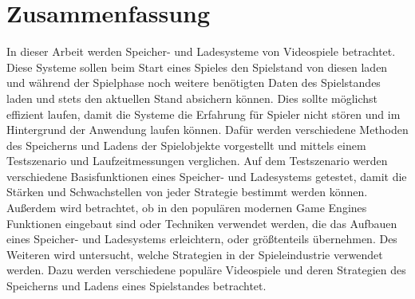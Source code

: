 \chapter*{Zusammenfassung}


In dieser Arbeit werden Speicher- und Ladesysteme von Videospiele betrachtet. Diese Systeme sollen beim Start eines Spieles den Spielstand von diesen laden und während der Spielphase noch weitere benötigten Daten des Spielstandes laden und stets den aktuellen Stand absichern können. Dies sollte möglichst effizient laufen, damit die Systeme die Erfahrung für Spieler nicht stören und im Hintergrund der Anwendung laufen können. Dafür werden verschiedene Methoden des Speicherns und Ladens der Spielobjekte vorgestellt und mittels einem Testszenario und Laufzeitmessungen verglichen. Auf dem Testszenario werden verschiedene Basisfunktionen eines Speicher- und Ladesystems getestet, damit die Stärken und Schwachstellen von jeder Strategie bestimmt werden können. Außerdem wird betrachtet, ob in den populären modernen Game Engines Funktionen eingebaut sind oder Techniken verwendet werden, die das Aufbauen eines Speicher- und Ladesystems erleichtern, oder größtenteils übernehmen. Des Weiteren wird untersucht, welche Strategien in der Spieleindustrie verwendet werden. Dazu werden verschiedene populäre Videospiele und deren Strategien des Speicherns und Ladens eines Spielstandes betrachtet.
